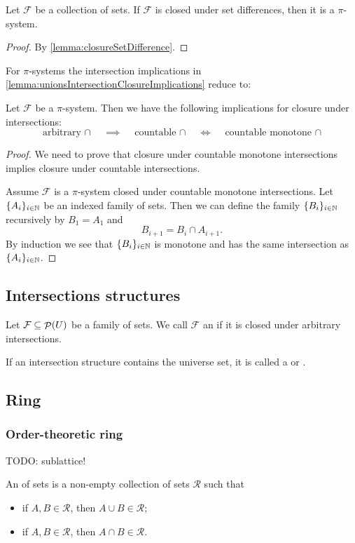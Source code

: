 \begin{lemma}
Let $\mathcal{F}$ be a collection of sets. If $\mathcal{F}$ is closed under set differences, then it is a $\pi$-system.
\end{lemma}
\begin{proof}
By \ref{lemma:closureSetDifference}.
\end{proof}

For $\pi$-systems the intersection implications in \ref{lemma:unionsIntersectionClosureImplications} reduce to:
\begin{lemma} \label{lemma:unionsIntersectionClosureImplications}
Let $\mathcal{F}$ be a $\pi$-system. Then we have the following implications for closure under intersections:
\[ \text{arbitrary $\cap$} \quad\implies\quad \text{countable $\cap$} \quad\iff\quad \text{countable monotone $\cap$} \]
\end{lemma}
\begin{proof}
We need to prove that closure under countable monotone intersections implies closure under countable intersections.

Assume $\mathcal{F}$ is a $\pi$-system closed under countable monotone intersections. Let $\{A_i\}_{i\in \mathbb{N}}$ be an indexed family of sets. Then we can define the family $\{B_i\}_{i\in \mathbb{N}}$ recursively by $B_1 = A_1$ and
\[ B_{i+1} = B_i \cap A_{i+1}. \]
By induction we see that $\{B_i\}_{i\in \mathbb{N}}$ is monotone and has the same intersection as $\{A_i\}_{i\in \mathbb{N}}$.
\end{proof}

\subsection{Intersections structures}
\begin{definition}
Let $\mathcal{F} \subseteq \mathop{\mathcal{P}}(U)$ be a family of sets. We call $\mathcal{F}$ an  if it is closed under arbitrary intersections.

If an intersection structure contains the universe set, it is called a  or .
\end{definition}

\subsection{Ring}
\subsubsection{Order-theoretic ring}
TODO: sublattice!
\begin{definition}
An  of sets is a non-empty collection of sets $\mathcal{R}$ such that
\begin{itemize}
\item if $A,B\in \mathcal{R}$, then $A\cup B\in \mathcal{R}$;
\item if $A,B\in \mathcal{R}$, then $A\cap B\in \mathcal{R}$.
\end{itemize}
\end{definition}

